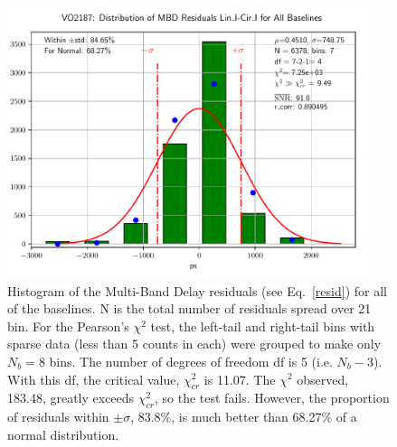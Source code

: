 \documentclass[letterpaper,twoside,12pt]{article}
\begin{document}
\begin{figure}[ht!]
  \begin{center}
  \includegraphics[width=25pc]{VO2187_Distr_MBD_Lin_I-Cir_I_Diff.pdf}
  \caption{\small Histogram of the Multi-Band Delay residuals (see Eq.~\eqref{resid}) for all of the baselines. N is the total number of residuals spread over 21 bin. For the Pearson's $\chi^2$ test, the left-tail and right-tail bins with sparse data (less than 5 counts in each) were grouped to make only $N_b=8$ bins. The number of degrees of freedom df is 5 (i.e. $N_b-3$). With this df, the critical value, $\chi^2_{cr}$ is 11.07. The $\chi^2$ observed, 183.48, greatly exceeds $\chi^2_{cr}$, so the test fails. However, the proportion of residuals within $\pm\sigma$, 83.8\%, is much better than 68.27\% of a normal distribution.}
  \label{dmbd_distr}
  \end{center}
\end{figure}
\end{document}
